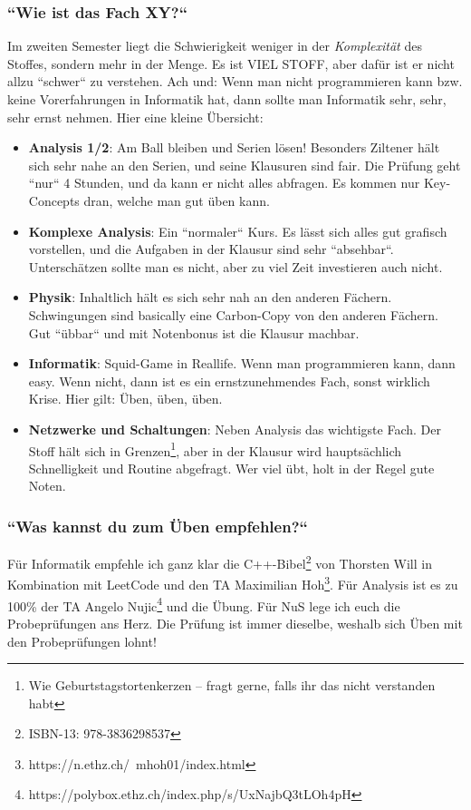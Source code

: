 \documentclass[11pt,a4paper]{article}
\begin{document}
\subsubsection{``Wie ist das Fach XY{?}``}
Im zweiten Semester liegt die Schwierigkeit weniger in der \textit{Komplexität} des Stoffes, sondern mehr in der Menge. Es ist VIEL STOFF, aber dafür ist er nicht allzu ``schwer`` zu verstehen. Ach und: Wenn man nicht programmieren kann bzw. keine Vorerfahrungen in Informatik hat, dann sollte man Informatik sehr, sehr, sehr ernst nehmen. Hier eine kleine Übersicht:

\begin{itemize}
    \item \textbf{Analysis 1/2}: Am Ball bleiben und Serien lösen! Besonders Ziltener hält sich sehr nahe an den Serien, und seine Klausuren sind fair. Die Prüfung geht ``nur`` 4 Stunden, und da kann er nicht alles abfragen. Es kommen nur Key-Concepts dran, welche man gut üben kann.
    \item \textbf{Komplexe Analysis}: Ein ``normaler`` Kurs. Es lässt sich alles gut grafisch vorstellen, und die Aufgaben in der Klausur sind sehr ``absehbar``. Unterschätzen sollte man es nicht, aber zu viel Zeit investieren auch nicht.
    \item \textbf{Physik}: Inhaltlich hält es sich sehr nah an den anderen Fächern. Schwingungen sind basically eine Carbon-Copy von den anderen Fächern. Gut ``übbar`` und mit Notenbonus ist die Klausur machbar.
    \item \textbf{Informatik}: Squid-Game in Reallife. Wenn man programmieren kann, dann easy. Wenn nicht, dann ist es ein ernstzunehmendes Fach, sonst wirklich Krise. Hier gilt: Üben, üben, üben.
    \item \textbf{Netzwerke und Schaltungen}: Neben Analysis das wichtigste Fach. Der Stoff hält sich in Grenzen\footnote{Wie Geburtstagstortenkerzen – fragt gerne, falls ihr das nicht verstanden habt}, aber in der Klausur wird hauptsächlich Schnelligkeit und Routine abgefragt. Wer viel übt, holt in der Regel gute Noten.
\end{itemize}

\subsubsection{``Was kannst du zum Üben empfehlen{?}``}
Für Informatik empfehle ich ganz klar die C++-Bibel\footnote{ISBN-13: 978-3836298537} von Thorsten Will in Kombination mit LeetCode und den TA Maximilian Hoh\footnote{https://n.ethz.ch/~mhoh01/index.html}. Für Analysis ist es zu 100\% der TA Angelo Nujic\footnote{https://polybox.ethz.ch/index.php/s/UxNajbQ3tLOh4pH} und die Übung. Für NuS lege ich euch die Probeprüfungen ans Herz. Die Prüfung ist immer dieselbe, weshalb sich Üben mit den Probeprüfungen lohnt!
\end{document}
